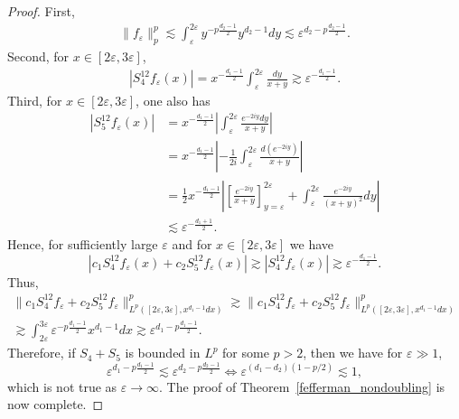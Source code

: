 \documentclass[12pt]{amsart}
\begin{document}
\begin{proof}
First,
\begin{align*}
    \| f_\varepsilon \|_p^p \lesssim \int_\varepsilon^{2\varepsilon} y^{-p \frac{d_2-1}{2}} y^{d_2-1} dy \lesssim \varepsilon^{d_2 - p \frac{d_2-1}{2}}.
\end{align*}
Second, for $x\in [2\varepsilon,3\varepsilon]$,
\begin{align*}
    |S_4^{12}f_{\varepsilon}(x)| = x^{-\frac{d_1-1}{2}} \int_\varepsilon^{2\varepsilon} \frac{dy}{x+y} \gtrsim \varepsilon^{-\frac{d_1-1}{2}}.
\end{align*}
Third, for $x\in [2\varepsilon,3\varepsilon]$, one also has
\begin{align*}
    |S_5^{12} f_\varepsilon(x)| &= x^{-\frac{d_1-1}{2}} \left| \int_\varepsilon^{2\varepsilon} \frac{e^{-2iy}dy}{x+y} \right| \\
    &= x^{-\frac{d_1-1}{2}} \left| -\frac{1}{2i} \int_\varepsilon^{2\varepsilon} \frac{d (e^{-2iy}) }{x+y} \right|\\
    &= \frac{1}{2} x^{-\frac{d_1-1}{2}} \left| \left[\frac{e^{-2iy}}{x+y}\right]_{y=\varepsilon}^{2\varepsilon} +   \int_\varepsilon^{2\varepsilon} \frac{e^{-2iy}}{(x+y)^2} dy  \right|\\
    &\lesssim \varepsilon^{-\frac{d_1+1}{2}}.
\end{align*} 
Hence, for sufficiently large $\varepsilon$ and  for $x\in [2\varepsilon,3\varepsilon]$ we have 
\begin{equation*}
    |c_1 S_4^{12}f_\varepsilon(x) + c_2 S_5^{12}f_\varepsilon(x)| \gtrsim |S_4^{12}f_\varepsilon(x)| \gtrsim \varepsilon^{-\frac{d_1-1}{2}}.
\end{equation*}
Thus,
\begin{align*}
 \| c_1 S_4^{12} f_\varepsilon + c_2S_5^{12} f_\varepsilon\|_{L^p([2\varepsilon,3\varepsilon], x^{d_1-1} dx)}^p \gtrsim \| c_1 S_4^{12} f_\varepsilon + c_2 S_5^{12} f_\varepsilon \|_{L^p([2\varepsilon,3\varepsilon], x^{d_1-1}dx)}^p \\ \gtrsim \int_{2\varepsilon}^{3\varepsilon} \varepsilon^{-p \frac{d_1-1}{2}} x^{d_1-1} dx \gtrsim \varepsilon^{d_1-p\frac{d_1-1}{2}}.
\end{align*}
Therefore, if $S_4+S_5$ is bounded in $L^p$ for some $p>2$, then we have for $\varepsilon  \gg 1$,
\begin{equation*}
    \varepsilon^{d_1-p\frac{d_1-1}{2}} \lesssim \varepsilon^{d_2 - p \frac{d_2-1}{2}} \iff \varepsilon^{(d_1-d_2)(1-p/2)} \lesssim 1,
\end{equation*}
which is not true as $\varepsilon\to \infty$. The proof of Theorem~\ref{fefferman_nondoubling} is now complete.
\end{proof}
\end{document}

